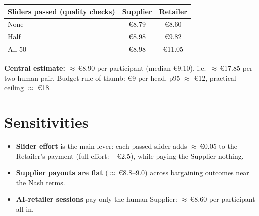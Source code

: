 \documentclass[11pt]{article}
\begin{document}
\begin{table}[h]\centering
\begin{tabular}{lcc}
\toprule
Sliders passed (quality checks) & Supplier & Retailer \\
\midrule
None    & \euro{8.79} & \euro{8.60} \\
Half    & \euro{8.98} & \euro{9.82} \\
All 50  & \euro{8.98} & \euro{11.05} \\
\bottomrule
\end{tabular}
\end{table}

\noindent\textbf{Central estimate:} $\approx$\,\euro{8.90} per participant
(median \euro{9.10}), i.e.\ $\approx$\,\euro{17.85} per two-human pair.
Budget rule of thumb: \euro{9} per head, p95 $\approx$ \euro{12},
practical ceiling $\approx$ \euro{18}.

\section*{Sensitivities}
\begin{itemize}
  \item \textbf{Slider effort} is the main lever: each passed slider adds
        $\approx$\,\euro{0.05} to the Retailer's payment (full effort:
        $+$\euro{2.5}), while paying the Supplier nothing.
  \item \textbf{Supplier payouts are flat} ($\approx$\,\euro{8.8--9.0})
        across bargaining outcomes near the Nash terms.
  \item \textbf{AI-retailer sessions} pay only the human Supplier:
        $\approx$\,\euro{8.60} per participant all-in.
\end{itemize}
\end{document}

